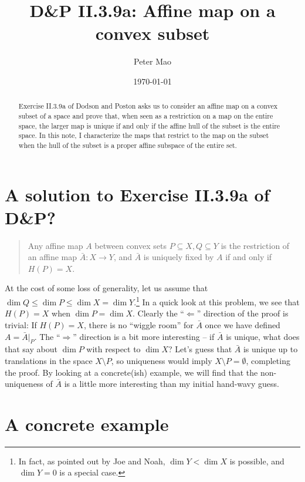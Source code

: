 \documentclass[11pt]{article}
\title{D\&P II.3.9a: Affine map on a convex subset}
\author{Peter Mao}
\date{\today}
\begin{document}
\maketitle


\begin{abstract}
  Exercise II.3.9a of Dodson and Poston asks us to consider an affine
  map on a convex subset of a space and prove that, when seen as a
  restriction on a map on the entire space, the larger map is unique
  if and only if the affine hull of the subset is the entire space.
  In this note, I characterize the maps that restrict to the map on
  the subset when the hull of the subset is a proper affine subspace
  of the entire set.
\end{abstract}


\section{A solution to Exercise II.3.9a of D\&P?}
\begin{quote}
Any affine map $A$ between convex sets $P \subseteq X, Q \subseteq Y$
is the restriction of an affine map $\bar{A} : X \rightarrow Y$, and
$\bar{A}$ is uniquely fixed by $A$ if and only if $H(P) = X$.
\end{quote}

At the cost of some loss of generality, let us assume that $\dim Q \le
\dim P \le \dim X = \dim Y $.\footnote{In fact, as pointed out by Joe
  and Noah, $\dim Y < \dim X$ is possible, and $\dim Y = 0$ is a
  special case.}  In a quick look at this problem, we see that $H(P) =
X$ when $\dim P = \dim X$.  Clearly the ``$\Leftarrow$'' direction of
the proof is trivial: If $H(P) = X$, there is no ``wiggle room'' for
$\bar{A}$ once we have defined $A = \bar{A}|_P$.  The
``$\Rightarrow$'' direction is a bit more interesting -- if $\bar{A}$
is unique, what does that say about $\dim P$ with respect to $\dim X$?
Let's guess that $\bar{A}$ is unique up to translations in the space
$X \setminus P$, so uniqueness would imply $X \setminus P =
\emptyset$, completing the proof.  By looking at a concrete(ish)
example, we will find that the non-uniqueness of $\bar{A}$ is a little
more interesting than my initial hand-wavy guess.

\section{A concrete example}
\end{document}
